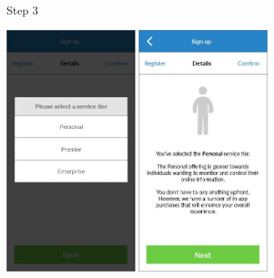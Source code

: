 \begin{figure}
\begin{minipage}{4.6cm}
    \caption{Step 3}%
    \label{fig:ui_step3}
  \end{minipage}
\end{figure}

\begin{figure}
  \subfigures
  \centering
  \begin{minipage}{4.6cm}
    \centering
    \includegraphics[width=4.2cm]{inc/ui_step3.jpg}
    \caption{}%
    \label{fig:ui_step3}
  \end{minipage}
  \begin{minipage}{4.6cm}
    \centering
    \includegraphics[width=4.2cm]{inc/ui_step4a.jpg}
    \caption{}%
    \label{fig:ui_step4a}
  \end{minipage}
  \begin{minipage}{4.6cm}
    \centering

\end{minipage}
\end{figure}
